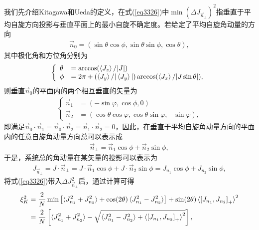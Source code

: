 我们先介绍Kitagawa和Ueda的定义，在式(\ref{eq3326})中$\min {\left( {\Delta {J_{{{\vec n}_ \bot }}}} \right)^2}$指垂直于平均自旋方向投影与垂直平面上的最小自旋不确定度。若给定了平均自旋角动量的方向
\begin{align}
	{\vec n_0} = \left( {\sin \theta \cos \phi ,\sin \theta \sin \phi ,\cos \theta } \right),\label{eq3328}
\end{align}
其中极化角和方位角分别为
\begin{align}\label{eq3329}
	\left\{ \begin{array}{ll}
		\theta&=\arccos (\braket{J_z}/|J|)\\
		\phi &= 2\pi + (\braket{J_y}/|\braket{J_y}|)\arccos (\braket{J_x}/|J\sin \theta|),
	\end{array} \right.
\end{align}
则垂直${\vec n_0}$的平面内的两个相互垂直的矢量为
\begin{align}\label{eq3330}
	\left\{ \begin{array}{ll}
		{\vec n_1} &= (-\sin\varphi, \cos\phi,0)\\
		{\vec n_2} &= (\cos\theta\cos\varphi, \cos\theta\sin\varphi, -\sin\varphi),
	\end{array} \right.
\end{align}
即满足${\vec n_0} \cdot {\vec n_1} = {\vec n_0} \cdot {\vec n_2} = {\vec n_1} \cdot {\vec n_2} = 0$，因此，在垂直于平均自旋角动量方向的平面内的任意自旋角动量方向总可以表示成
\begin{align}
	{\vec n_ \bot } = {\vec n_1}\cos \phi  + {\vec n_2}\sin \phi ,\label{eq3331}
\end{align}
于是，系统总的角动量在某矢量的投影可以表示为
\begin{align}
	{J_{{{\vec n}_ \bot }}} = J \cdot {\vec n_ \bot } = J \cdot {\vec n_1}\cos \phi  + J \cdot {\vec n_2}\sin \phi  = {J_{{n_1}}}\cos \phi  + {J_{{n_2}}}\sin \phi ,\label{eq3332}
\end{align}
将式(\ref{eq3326})带入$\Delta J_{{{\vec n}_ \bot }}^2$后，通过计算可得
\begin{align}\label{eq3333}
	\begin{split}
		\xi _K^2 &= \frac{2}{N}\min \left[ \braket{J_{n_1}^2 + J_{n_2}^2}+ \cos (2\theta)\braket{J_{n_1}^2 - J_{n_2}^2}\right] + \sin ( 2\theta )
		\braket{\left[ J_{n_1},J_{n_2} \right]_+ }^2\\
		&= \frac{2}{N}\left[\braket{J_{n_1}^2 + J_{n_2}^2}- \sqrt {\braket{J_{n_1}^2 - J_{n_2}^2} + \braket{\left[ J_{n_1},J_{n_2} \right]_+ }^2} \right],
	\end{split}
\end{align}




